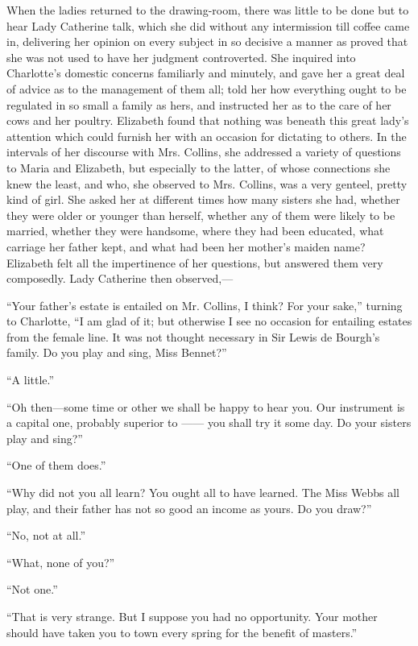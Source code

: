 When the ladies returned to the drawing-room, there was little to be done but to hear Lady Catherine talk, which she did without any intermission till coffee came in, delivering her opinion on every subject in so decisive a manner as proved that she was not used to have her judgment controverted. She inquired into Charlotte's domestic concerns familiarly and minutely, and gave her a great deal of advice as to the management of them all; told her how everything ought to be regulated in so small a family as hers, and instructed her as to the care of her cows and her poultry. Elizabeth found that nothing was beneath this great lady's attention which could furnish her with an occasion for dictating to others. In the intervals of her discourse with Mrs. Collins, she addressed a variety of questions to Maria and Elizabeth, but especially to the latter, of whose connections she knew the least, and who, she observed to Mrs. Collins, was a very genteel, pretty kind of girl. She asked her at different times how many sisters she had, whether they were older or younger than herself, whether any of them were likely to be married, whether they were handsome, where they had been educated, what carriage her father kept, and what had been her mother's maiden name? Elizabeth felt all the impertinence of her questions, but answered them very composedly. Lady Catherine then observed,---

``Your father's estate is entailed on Mr. Collins, I think? For your sake,'' turning to Charlotte, ``I am glad of it; but otherwise I see no occasion for entailing estates from the female line. It was not thought necessary in Sir Lewis de Bourgh's family. Do you play and sing, Miss Bennet?''

``A little.''

``Oh then---some time or other we shall be happy to hear you. Our instrument is a capital one, probably superior to ------ you shall try it some day. Do your sisters play and sing?''

``One of them does.''

``Why did not you all learn? You ought all to have learned. The Miss Webbs all play, and their father has not so good an income as yours. Do you draw?''

``No, not at all.''

``What, none of you?''

``Not one.''

``That is very strange. But I suppose you had no opportunity. Your mother should have taken you to town every spring for the benefit of masters.''


